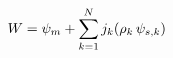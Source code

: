 \documentclass[preview]{standalone}
\begin{document}
\begin{align*}
\special{dvisvgm:raw <g id='unique000'>}W = \psi_m + \sum_{k=1}^{N} j_k(\rho_k\,\psi_{s,k})\special{dvisvgm:raw </g>}
\end{align*}
\end{document}
